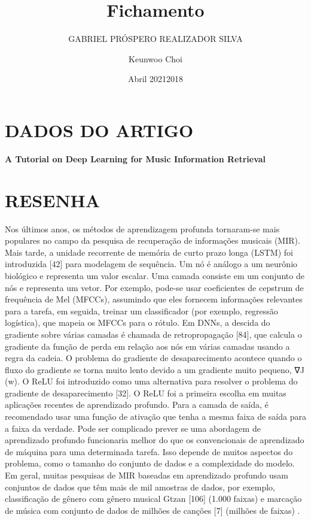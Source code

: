 \documentclass{article}
\title{Fichamento}
\author{GABRIEL PRÓSPERO REALIZADOR  SILVA}
\date{Abril 2021}
\begin{document}
\maketitle

\section{DADOS DO ARTIGO}
\textbf{A Tutorial on Deep Learning for Music Information Retrieval\\}
\author{Keunwoo Choi \\}
\date{2018}

\section{RESENHA} 
Nos últimos anos, os métodos de aprendizagem profunda tornaram-se mais populares no campo da pesquisa de recuperação de informações musicais (MIR).
Mais tarde, a unidade recorrente de memória de curto prazo longa (LSTM) foi introduzida [42] para modelagem de sequência.
Um nó é análogo a um neurônio biológico e representa um valor escalar. Uma camada consiste em um conjunto de nós e representa um vetor.
Por exemplo, pode-se usar coeficientes de cepstrum de frequência de Mel (MFCCs), assumindo que eles fornecem informações relevantes para a tarefa, em seguida, treinar um classificador (por exemplo, regressão logística), que mapeia os MFCCs para o rótulo.
Em DNNs, a descida do gradiente sobre várias camadas é chamada de retropropagação [84], que calcula o gradiente da função de perda em relação aos nós em várias camadas usando a regra da cadeia.
O problema do gradiente de desaparecimento acontece quando o fluxo do gradiente se torna muito lento devido a um gradiente muito pequeno, ∇J (w).
O ReLU foi introduzido como uma alternativa para resolver o problema do gradiente de desaparecimento [32]. O ReLU foi a primeira escolha em muitas aplicações recentes de aprendizado profundo. Para a camada de saída, é recomendado usar uma função de ativação que tenha a mesma faixa de saída para a faixa da verdade.
Pode ser complicado prever se uma abordagem de aprendizado profundo funcionaria melhor do que os convencionais de aprendizado de máquina para uma determinada tarefa. Isso depende de muitos aspectos do problema, como o tamanho do conjunto de dados e a complexidade do modelo. Em geral, muitas pesquisas de MIR baseadas em aprendizado profundo usam conjuntos de dados que têm mais de mil amostras de dados, por exemplo, classificação de gênero com gênero musical Gtzan [106] (1.000 faixas) e marcação de música com conjunto de dados de milhões de canções [7] (milhões de faixas) .
\end{document}
